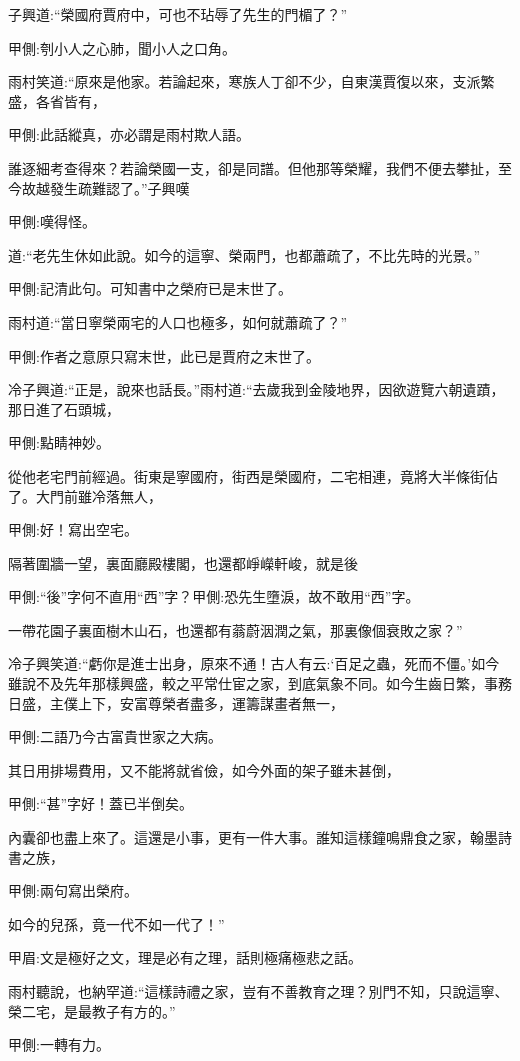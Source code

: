 \begin{parag}
    子興道:“榮國府賈府中，可也不玷辱了先生的門楣了？”\begin{note}甲側:刳小人之心肺，聞小人之口角。\end{note}雨村笑道:“原來是他家。若論起來，寒族人丁卻不少，自東漢賈復以來，支派繁盛，各省皆有，\begin{note}甲側:此話縱真，亦必謂是雨村欺人語。\end{note}誰逐細考查得來？若論榮國一支，卻是同譜。但他那等榮耀，我們不便去攀扯，至今故越發生疏難認了。”子興嘆\begin{note}甲側:嘆得怪。\end{note}道:“老先生休如此說。如今的這寧、榮兩門，也都蕭疏了，不比先時的光景。”\begin{note}甲側:記清此句。可知書中之榮府已是末世了。\end{note}雨村道:“當日寧榮兩宅的人口也極多，如何就蕭疏了？”\begin{note}甲側:作者之意原只寫末世，此已是賈府之末世了。\end{note}冷子興道:“正是，說來也話長。”雨村道:“去歲我到金陵地界，因欲遊覽六朝遺蹟，那日進了石頭城，\begin{note}甲側:點睛神妙。\end{note}從他老宅門前經過。街東是寧國府，街西是榮國府，二宅相連，竟將大半條街佔了。大門前雖冷落無人，\begin{note}甲側:好！寫出空宅。\end{note}隔著圍牆一望，裏面廳殿樓閣，也還都崢嶸軒峻，就是後\begin{note}甲側:“後”字何不直用“西”字？甲側:恐先生墮淚，故不敢用“西”字。\end{note}一帶花園子裏面樹木山石，也還都有蓊蔚洇潤之氣，那裏像個衰敗之家？”
\end{parag}


\begin{parag}
    冷子興笑道:“虧你是進士出身，原來不通！古人有云:‘百足之蟲，死而不僵。’如今雖說不及先年那樣興盛，較之平常仕宦之家，到底氣象不同。如今生齒日繁，事務日盛，主僕上下，安富尊榮者盡多，運籌謀畫者無一，\begin{note}甲側:二語乃今古富貴世家之大病。\end{note}其日用排場費用，又不能將就省儉，如今外面的架子雖未甚倒，\begin{note}甲側:“甚”字好！蓋已半倒矣。\end{note}內囊卻也盡上來了。這還是小事，更有一件大事。誰知這樣鐘鳴鼎食之家，翰墨詩書之族，\begin{note}甲側:兩句寫出榮府。\end{note}如今的兒孫，竟一代不如一代了！”\begin{note}甲眉:文是極好之文，理是必有之理，話則極痛極悲之話。\end{note}雨村聽說，也納罕道:“這樣詩禮之家，豈有不善教育之理？別門不知，只說這寧、榮二宅，是最教子有方的。”\begin{note}甲側:一轉有力。\end{note}
\end{parag}


